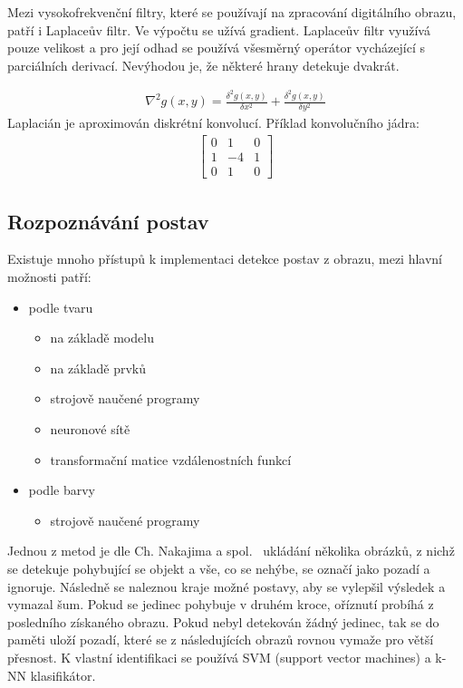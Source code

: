 Mezi vysokofrekvenční filtry, které se používají na zpracování digitálního obrazu, patří i Laplaceův filtr. Ve výpočtu se užívá gradient. Laplaceův filtr využívá pouze velikost a pro její odhad se používá všesměrný operátor vycházející s parciálních derivací. Nevýhodou je, že některé hrany detekuje dvakrát. %

\begin{eqnarray}
\nabla^{2}g(x,y) = \frac{\delta^{2}g(x,y)}{\delta x^{2}} + \frac{\delta^{2}g(x,y)}{\delta y^{2}}
\end{eqnarray} 
Laplacián je aproximován diskrétní konvolucí. Příklad konvolučního jádra:
\begin{eqnarray}
\begin{bmatrix}
0 & 1 & 0 \\
1 & -4 & 1 \\
0 & 1 & 0
\end{bmatrix}
\end{eqnarray} 


\subsection{Rozpoznávání postav}
Existuje mnoho přístupů k implementaci detekce postav z obrazu, mezi hlavní možnosti patří:
\begin{itemize}
\item podle tvaru
\begin{itemize}
\item na základě modelu
\item na základě prvků
\item strojově naučené programy
\item neuronové sítě %
\item transformační matice vzdálenostních funkcí ~\cite{Cham}
\end{itemize}
\item podle barvy
\begin{itemize}
\item strojově naučené programy\\
\end{itemize}
\end{itemize}

Jednou z metod je dle Ch. Nakajima a spol.~\cite{6} ukládání několika obrázků, z nichž se detekuje pohybující se objekt a vše, co se nehýbe, se označí jako pozadí a ignoruje. Následně se naleznou kraje možné postavy, aby se vylepšil výsledek a vymazal šum. Pokud se jedinec pohybuje v druhém kroce, oříznutí probíhá z posledního získaného obrazu. Pokud nebyl detekován žádný jedinec, tak se do paměti uloží pozadí, které se z následujících obrazů rovnou vymaže pro větší přesnost. K vlastní identifikaci se používá SVM (support vector machines) a k-NN klasifikátor.\\

